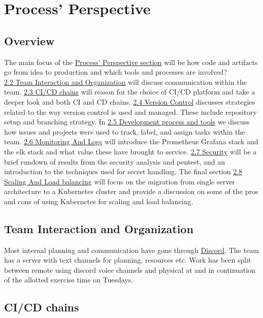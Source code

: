 \section{Process' Perspective}
\label{sec:processPerspective}

\subsection{Overview}
\label{subsec:overview}
The main focus of the \hyperref[sec:processPerspective]{Process' Perspective section} will be how code and artifacts go from idea to production and which tools and processes are involved?\\
\hyperref[subsec:TeamInteraction]{2.2 Team Interaction and Organization} will discuss communication within the team. \hyperref[subsec:cicd]{2.3 CI/CD chains} will reason for the choice of CI/CD platform and take a deeper look and both CI and CD chains.
\hyperref[subsec:vs]{2.4 Version Control} discusses strategies related to the way version control is used and managed. These include repository setup and branching strategy. In 
\hyperref[subsec:process&tools]{2.5 Development process and tools} we discuss how issues and projects were used to track, label, and assign tasks within the team.
\hyperref[subsec:monitoring]{2.6 Monitoring And Logs} will introduce the Prometheus Grafana stack and the elk stack and what value these have brought to service.
\hyperref[subsec:security]{2.7 Security} will be a brief rundown of results from the security analysis and pentest, and an introduction to the techniques used for secret handling.
The final section \hyperref[subsec:scaling]{2.8 Scaling And Load balancing} will focus on the migration from single server architecture to a Kubernetes cluster and provide a discussion on some of the pros and cons of using Kubernetes for scaling and load balancing.

\subsection{Team Interaction and Organization}
\label{subsec:TeamInteraction}
Most internal planning and communication have gone through \href{https://discord.com/}{Discord}. The team has a server with text channels for planning, resources etc. Work has been split between remote using discord voice channels and physical at and in continuation of the allotted exercise time on Tuesdays.
\subsection{CI/CD chains}
\label{subsec:cicd}

